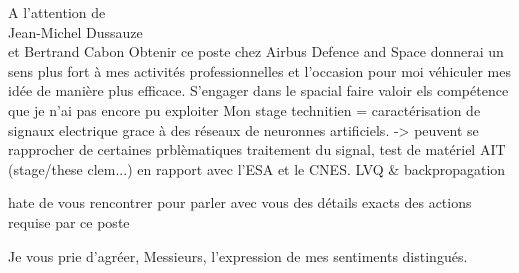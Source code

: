 \documentclass[12pt]{lettre}
\begin{document}
\begin{letter}{A l'attention de\\Jean-Michel Dussauze\\et Bertrand Cabon}
{%
Obtenir ce poste chez Airbus Defence and Space donnerai un sens plus fort
à mes activités professionnelles et l'occasion pour moi véhiculer mes idée de manière plus efficace. S'engager dans le spacial
faire valoir els compétence que je n'ai pas encore pu exploiter
Mon stage technitien = caractérisation de signaux electrique grace à des réseaux
de neuronnes artificiels. -> peuvent se rapprocher de certaines prblèmatiques
traitement du signal, test de matériel AIT (stage/these clem...) en rapport avec
l'ESA et le CNES. LVQ \& backpropagation
}

hate de vous rencontrer pour parler avec vous des détails exacts des actions
requise par ce poste

\closing{Je vous prie d'agréer, Messieurs, l'expression de mes sentiments distingués.}
\end{letter}
\end{document}
